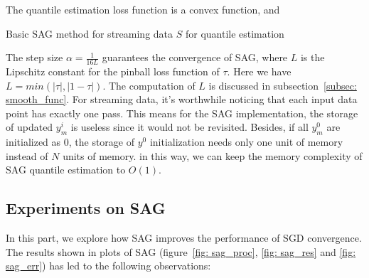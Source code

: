 The quantile estimation loss function is a convex function, and 
\begin{algorithm}
    \caption{Basic SAG method for streaming data $S$ for quantile estimation}\label{alg:SAG}
        \begin{algorithmic}[1]
                       
                 
            \EndFor
        \end{algorithmic}
\end{algorithm}
The step size $\alpha = \frac{1}{16L}$ guarantees the convergence of SAG, where $L$ is the Lipschitz constant for the pinball loss function of $\tau$. Here we have $L = min(|\tau|, |1-\tau|)$. The computation of $L$ is discussed in subsection~\ref{subsec: smooth_func}.  For streaming data, it's worthwhile noticing that each input data point has exactly one pass. This means for the SAG implementation, the storage of updated $y_m^i$ is useless since it would not be revisited. Besides, if all $y_m^0$ are initialized as $0$, the storage of $y^0$ initialization needs only one unit of memory instead of $N$ units of memory. in this way, we can keep the memory complexity of SAG quantile estimation to $O(1)$.



\subsection{Experiments on SAG}

In this part, we explore how SAG improves the performance of SGD convergence. The results shown in plots of SAG (figure~\ref{fig: sag_proc}, \ref{fig: sag_res} and \ref{fig: sag_err}) has led to the following observations:

